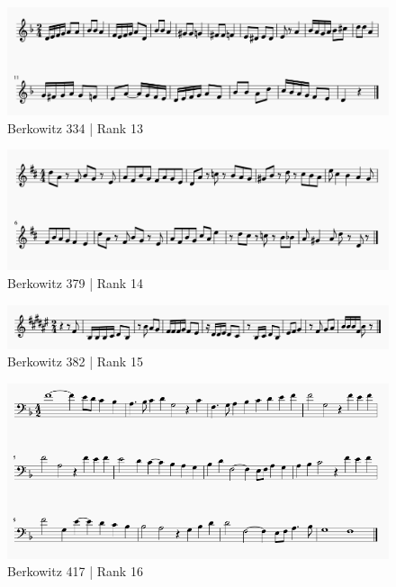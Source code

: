 \documentclass[]{book}
\begin{document}
\begin{figure}

{\centering \includegraphics[width=1\linewidth]{img/survey_melodies/Berkowitz334t} 

}

\caption{Berkowitz 334 | Rank 13}\label{fig:berk334t}
\end{figure}

\begin{figure}

{\centering \includegraphics[width=1\linewidth]{img/survey_melodies/Berkowitz379} 

}

\caption{Berkowitz 379 | Rank 14}\label{fig:berk379}
\end{figure}

\begin{figure}

{\centering \includegraphics[width=1\linewidth]{img/survey_melodies/Berkowitz382t} 

}

\caption{Berkowitz 382 | Rank 15}\label{fig:berk382}
\end{figure}

\begin{figure}

{\centering \includegraphics[width=1\linewidth]{img/survey_melodies/Berkowitz417tx} 

}

\caption{Berkowitz 417 | Rank 16}\label{fig:berk417tx}
\end{figure}
\end{document}
